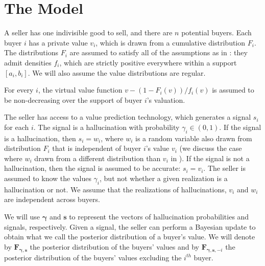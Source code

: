 \section{The Model}\label{sec:model}

A seller has one indivisible good to sell, and there are $n$ potential buyers. Each buyer $i$ has a private value $v_i$, which is drawn from a cumulative distribution $F_i$. The distributions $F_i$ are assumed to satisfy all of the assumptions as in \citet{myerson1981optimal}: they admit densities $f_i$, which are strictly positive everywhere within a support $[a_i,b_i]$. We will also assume the value distributions are regular.  

\begin{assumption}[Regularity]\label{ass:regular} For every $i$, the virtual value function $v-(1-F_i(v))/f_i(v)$ is assumed to be non-decreasing over the support of buyer $i$'s valuation. 
\end{assumption}

The seller has access to a value prediction technology, which generates a signal $s_i$ for each $i$. The signal is a hallucination with probability $\gamma_i \in (0,1)$. If the signal is a hallucination, then $s_i = w_i$, where $w_i$ is a random variable also drawn from distribution $F_i$ that is independent of buyer $i$'s value $v_i$ (we discuss the case where $w_i$ drawn from a different distribution than $v_i$ in  ). If the signal is not a hallucination, then the signal is assumed to be accurate: $s_i = v_i$. The seller is assumed to know the values $\gamma_i$, but not whether a given realization is a hallucination or not. We assume that the realizations of hallucinations, $v_i$ and $w_i$ are independent across buyers. 

We will use $\bm{\gamma}$ and $\bm{s}$ to represent the vectors of hallucination probabilities and signals, respectively. Given a signal, the seller can perform a Bayesian update to obtain what we call the posterior distribution of a buyer's value. We will denote by $\bm{F}_{\bm{\gamma},\bm{s}}$ the posterior distribution of the buyers' values and by $\bm{F}_{\bm{\gamma},\bm{s},-i}$ the posterior distribution of the buyers' values excluding the $i^{th}$ buyer.
 
